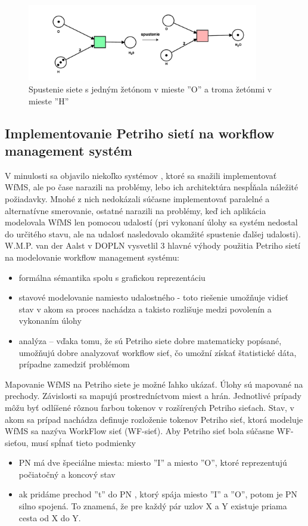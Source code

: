 \begin{figure}[h]
	\centerline{\includegraphics[width=0.9\textwidth]{images/vojvoda2}}
	\caption{Spustenie siete s jedným žetónom v mieste ''O'' a troma žetónmi v mieste ''H''}
	\label{obr:voda2}
\end{figure}





\subsection{Implementovanie Petriho sietí na workflow management systém}
\label{kap:teoria_petriho_siete_na_workflow}
V minulosti sa objavilo niekoľko systémov , ktoré sa snažili implementovať WfMS, ale po čase narazili na problémy, lebo ich architektúra nespĺňala náležité požiadavky. Mnohé z nich nedokázali súčasne implementovať paralelné a alternatívne smerovanie, ostatné narazili na problémy, keď ich aplikácia modelovala WfMS len pomocou udalostí (pri vykonaní úlohy sa systém nedostal do určitého stavu, ale na udalosť nasledovalo okamžité spustenie ďalšej udalosti).
W.M.P. van der Aalst v DOPLN
vysvetlil 3 hlavné výhody použitia Petriho sietí na modelovanie workflow management systému:
\begin{itemize}
	\item formálna sémantika spolu s grafickou reprezentáciu
	\item stavové modelovanie namiesto udalostného - toto riešenie umožňuje vidieť stav v akom sa proces nachádza a takisto rozlišuje medzi povolenín a vykonaním úlohy  %
	\item analýza – vďaka tomu, že sú Petriho siete dobre matematicky popísané, umožňujú dobre analyzovať workflow sieť, čo umožní získať štatistické dáta, prípadne zamedziť problémom
\end{itemize}

Mapovanie WfMS na Petriho siete je možné ľahko ukázať. Úlohy sú mapované na prechody. Závislosti sa mapujú prostredníctvom miest a hrán. Jednotlivé prípady môžu byť odlíšené rôznou farbou tokenov v rozšírených Petriho sieťach. Stav, v akom sa prípad nachádza definuje rozloženie tokenov
Petriho sieť, ktorá modeluje WfMS sa nazýva WorkFlow sieť (WF-sieť). Aby Petriho sieť bola súčasne WF-sieťou, musí spĺnať tieto podmienky
\begin{itemize}
	\item PN má dve špeciálne miesta: miesto ''I'' a miesto ''O'', ktoré reprezentujú počiatočný a koncový stav 
	\item  ak pridáme prechod ''t'' do PN , ktorý spája miesto ''I'' a ''O'', potom je PN silno spojená. To znamená, že pre každý pár uzlov X a Y  existuje priama cesta od X do Y. 
\end{itemize}

